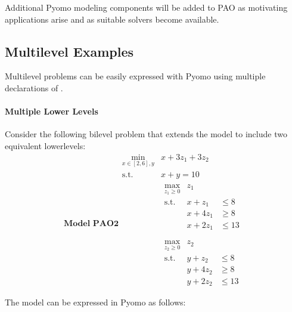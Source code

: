 \documentclass[letterpaper,10pt,english]{sphinxmanual}
\begin{document}
Additional Pyomo modeling components will be added to PAO as motivating
applications arise and as suitable solvers become available.


\subsection{Multilevel Examples}
\label{\detokenize{representations/pyomo:multilevel-examples}}
Multilevel problems can be easily expressed with Pyomo using multiple declarations
of {\hyperref[\detokenize{reference/pyomo:pao.pyomo.components.SubModel}]{}}.


\paragraph{Multiple Lower Levels}
\label{\detokenize{representations/pyomo:multiple-lower-levels}}
Consider the following bilevel problem that
extends the  model to include two equivalent lower\sphinxhyphen{}levels:
\label{equation:sand:eq-pao2} \begin{equation*}
 \textbf{Model PAO2}
 \begin{array}{ll}
 \min_{x\in[2,6],y} & x + 3 z_1 + 3 z_2 \\
 \textrm{s.t.} & x + y = 10\\
 & \begin{array}{lll}
   \max_{z_1 \geq 0} & z_1 &\\
   \textrm{s.t.} & x+z_1 &\leq 8\\
   & x + 4 z_1 &\geq 8\\
   & x + 2 z_1 &\leq 13\\
   \end{array}\\
 & \begin{array}{lll}
   \max_{z_2 \geq 0} & z_2 &\\
   \textrm{s.t.} & y+z_2 &\leq 8\\
   & y + 4 z_2 &\geq 8\\
   & y + 2 z_2 &\leq 13\\
   \end{array}\\
 \end{array}
 \end{equation*}
The  model can be expressed in Pyomo as follows:
\end{document}
